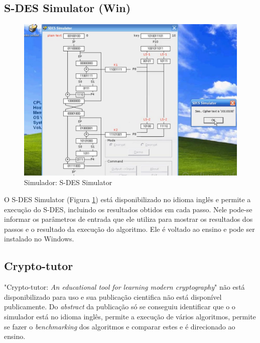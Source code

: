 \subsection{S-DES Simulator (Win)}

\begin{figure}[H]
    \centering
    \caption{Simulador: S-DES Simulator}
    \label{fig:sdessimulatoren}
    \includegraphics[width=.75\linewidth]{Simuladores/SDESSimulatorXp.png}
\end{figure}

O S-DES Simulator (Figura \ref{fig:sdessimulatoren}) está disponibilizado no idioma inglês e permite a execução do S-DES, incluindo os resultados obtidos em cada passo. Nele pode-se informar os parâmetros de entrada que ele utiliza para mostrar os resultados dos passos e o resultado da execução do algoritmo. Ele é voltado ao ensino e pode ser instalado no Windows. \cite{permadi18}


\subsection{Crypto-tutor}
"Crypto-tutor: \textit{An educational tool for learning modern cryptography}" \cite{luburic16} não está disponibilizado para uso e sua publicação cientifica não está disponível publicamente. Do \textit{abstract} da publicação só se conseguiu identificar que o o simulador está no idioma inglês, permite a execução de vários algoritmos, permite se fazer o \textit{benchmarking} dos algoritmos e comparar estes e é direcionado ao ensino.

